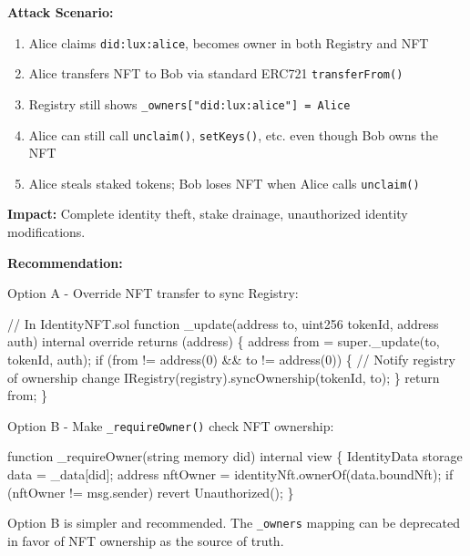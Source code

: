 \documentclass[
]{article}
\newenvironment{Shaded}{}{}
\newcommand{\NormalTok}[1]{#1}
\providecommand{\tightlist}{%
  \setlength{\itemsep}{0pt}\setlength{\parskip}{0pt}}
\begin{document}
\textbf{Attack Scenario:}

\begin{enumerate}
\def\labelenumi{\arabic{enumi}.}
\tightlist
\item
  Alice claims \texttt{did:lux:alice}, becomes owner in both Registry
  and NFT
\item
  Alice transfers NFT to Bob via standard ERC721 \texttt{transferFrom()}
\item
  Registry still shows \texttt{\_owners{[}"did:lux:alice"{]}\ =\ Alice}
\item
  Alice can still call \texttt{unclaim()}, \texttt{setKeys()}, etc. even
  though Bob owns the NFT
\item
  Alice steals staked tokens; Bob loses NFT when Alice calls
  \texttt{unclaim()}
\end{enumerate}

\textbf{Impact:} Complete identity theft, stake drainage, unauthorized
identity modifications.

\textbf{Recommendation:}

Option A - Override NFT transfer to sync Registry:

\begin{Shaded}
\begin{Highlighting}[]
\NormalTok{// In IdentityNFT.sol}
\NormalTok{function \_update(address to, uint256 tokenId, address auth) internal override returns (address) \{}
\NormalTok{    address from = super.\_update(to, tokenId, auth);}
\NormalTok{    if (from != address(0) \&\& to != address(0)) \{}
\NormalTok{        // Notify registry of ownership change}
\NormalTok{        IRegistry(registry).syncOwnership(tokenId, to);}
\NormalTok{    \}}
\NormalTok{    return from;}
\NormalTok{\}}
\end{Highlighting}
\end{Shaded}

Option B - Make \texttt{\_requireOwner()} check NFT ownership:

\begin{Shaded}
\begin{Highlighting}[]
\NormalTok{function \_requireOwner(string memory did) internal view \{}
\NormalTok{    IdentityData storage data = \_data[did];}
\NormalTok{    address nftOwner = identityNft.ownerOf(data.boundNft);}
\NormalTok{    if (nftOwner != msg.sender) revert Unauthorized();}
\NormalTok{\}}
\end{Highlighting}
\end{Shaded}

Option B is simpler and recommended. The \texttt{\_owners} mapping can
be deprecated in favor of NFT ownership as the source of truth.
\end{document}
